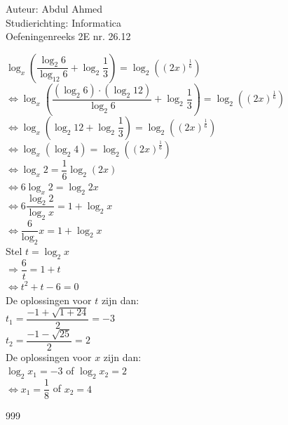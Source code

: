 \documentclass[a4paper]{article}
\begin{document}
  
\noindent \large Auteur: Abdul Ahmed \\
\noindent \large Studierichting: Informatica\\
\noindent \large Oefeningenreeks 2E nr. 26.12 \\

\medskip

\normalsize

$ \log_x \left( \dfrac{\log_2 6}{\log_{12} 6} + \log_2 \dfrac{1}{3} \right) = \log_2 \left( (2x)^{\tfrac{1}{6}} \right) $ \\

$ \Leftrightarrow \log_x \left( \dfrac{(\log_2 6) \cdot (\log_2 12)}{\log_2 6} + \log_2 \dfrac{1}{3} \right) = \log_2 \left( (2x)^{\tfrac{1}{6}} \right) $ \\

$ \Leftrightarrow \log_x \left( \log_2 12 + \log_2 \dfrac{1}{3} \right) = \log_2 \left( (2x)^{\tfrac{1}{6}} \right) $ \\

$ \Leftrightarrow \log_x \left( \log_2 4 \right) = \log_2 \left( (2x)^{\tfrac{1}{6}} \right) $ \\

$ \Leftrightarrow \log_x 2 = \dfrac{1}{6} \log_2 \left( 2x \right) $ \\

$ \Leftrightarrow 6 \log_x 2 = \log_2 2x $ \\

$ \Leftrightarrow 6 \dfrac{\log_2 2}{\log_2 x} = 1 + \log_2 x $ \\

$ \Leftrightarrow \dfrac{6}{\log_2} x = 1 + \log_2 x $ \\

Stel $ t = \log_2 x $ \\

$ \Rightarrow \dfrac{6}{t} = 1 + t $ \\

$ \Leftrightarrow t^2 + t - 6 = 0 $ \\

De oplossingen voor $ t $ zijn dan: \\

$ t_{1} = \dfrac{-1 + \sqrt{1 + 24}}{2} = -3 $ \\

$ t_{2} = \dfrac{-1 - \sqrt{25}}{2} = 2 $ \\

De oplossingen voor $ x $ zijn dan: \\

$ \log_2 x_{1} = -3 $ of $ \log_2 x_{2} = 2 $ \\

$ \Leftrightarrow x_{1} = \dfrac{1}{8} $ of $ x_{2} = 4 $ \\





\begin{thebibliography}{999}
\end{thebibliography}
\end{document}
